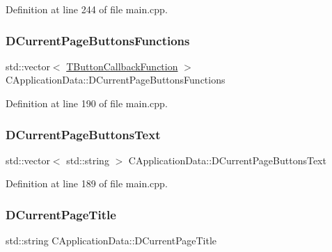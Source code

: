Definition at line 244 of file main.\+cpp.

\hypertarget{classCApplicationData_ad3079e5563a19d21c1e4ceff2a188382}{}\label{classCApplicationData_ad3079e5563a19d21c1e4ceff2a188382} 
\subsubsection{\texorpdfstring{D\+Current\+Page\+Buttons\+Functions}{DCurrentPageButtonsFunctions}}
{\footnotesize\ttfamily std\+::vector$<$ \hyperlink{main_8cpp_af91bc223ea3fea871af009bfef33c595}{T\+Button\+Callback\+Function} $>$ C\+Application\+Data\+::\+D\+Current\+Page\+Buttons\+Functions\hspace{0.3cm}{\ttfamily [protected]}}



Definition at line 190 of file main.\+cpp.

\hypertarget{classCApplicationData_af04b7f5f8ba4e5c99c0a3530055fc15d}{}\label{classCApplicationData_af04b7f5f8ba4e5c99c0a3530055fc15d} 
\subsubsection{\texorpdfstring{D\+Current\+Page\+Buttons\+Text}{DCurrentPageButtonsText}}
{\footnotesize\ttfamily std\+::vector$<$ std\+::string $>$ C\+Application\+Data\+::\+D\+Current\+Page\+Buttons\+Text\hspace{0.3cm}{\ttfamily [protected]}}



Definition at line 189 of file main.\+cpp.

\hypertarget{classCApplicationData_a49ce7f0b5891f0f2c29b73aad636b761}{}\label{classCApplicationData_a49ce7f0b5891f0f2c29b73aad636b761} 
\subsubsection{\texorpdfstring{D\+Current\+Page\+Title}{DCurrentPageTitle}}
{\footnotesize\ttfamily std\+::string C\+Application\+Data\+::\+D\+Current\+Page\+Title\hspace{0.3cm}{\ttfamily [protected]}}



